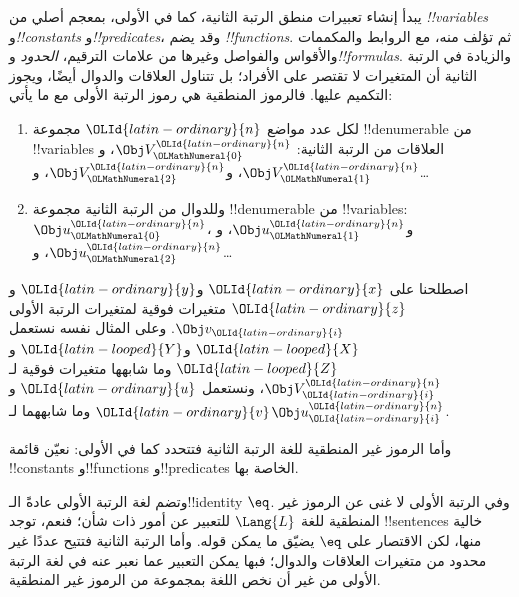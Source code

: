 \documentclass[../../../include/open-logic-section]{subfiles}
\begin{document}


يبدأ إنشاء تعبيرات منطق الرتبة الثانية، كما في الأولى، بمعجم
أصلي من \emph{!!{variable}s} و\emph{!!{constant}s}
و\emph{!!{predicate}s}، وقد يضم \emph{!!{function}s}.
ثم تؤلف منه، مع الروابط والمكممات والأقواس والفواصل وغيرها من
علامات الترقيم، \emph{الحدود} و\emph{!!{formula}s}.
والزيادة في الرتبة الثانية أن المتغيرات لا تقتصر على الأفراد؛
بل تتناول العلاقات والدوال أيضًا، ويجوز التكميم عليها.
فالرموز المنطقية هي رموز الرتبة الأولى مع ما يأتي:

\begin{enumerate}
\item لكل عدد مواضع ${\OLId{latin-ordinary}{n}}$ مجموعة !!{denumerable} من
  !!{variable}s العلاقات من الرتبة الثانية:
  $\Obj V_{\OLMathNumeral{0}}^{\OLId{latin-ordinary}{n}}$، و$\Obj V_{\OLMathNumeral{1}}^{\OLId{latin-ordinary}{n}}$، و$\Obj V_{\OLMathNumeral{2}}^{\OLId{latin-ordinary}{n}}$، و\dots
\item وللدوال من الرتبة الثانية مجموعة !!{denumerable} من
  !!{variable}s: $\Obj u_{\OLMathNumeral{0}}^{\OLId{latin-ordinary}{n}}$، و$\Obj u_{\OLMathNumeral{1}}^{\OLId{latin-ordinary}{n}}$، و$\Obj u_{\OLMathNumeral{2}}^{\OLId{latin-ordinary}{n}}$، و\dots
\end{enumerate}

اصطلحنا على ${\OLId{latin-ordinary}{x}}$ و${\OLId{latin-ordinary}{y}}$ و${\OLId{latin-ordinary}{z}}$ متغيرات فوقية لمتغيرات الرتبة
الأولى $\Obj v_{\OLId{latin-ordinary}{i}}$. وعلى المثال نفسه نستعمل ${\OLId{latin-looped}{X}}$ و${\OLId{latin-looped}{Y}}$ و${\OLId{latin-looped}{Z}}$
وما شابهها متغيرات فوقية لـ$\Obj V_{\OLId{latin-ordinary}{i}}^{\OLId{latin-ordinary}{n}}$، ونستعمل ${\OLId{latin-ordinary}{u}}$ و${\OLId{latin-ordinary}{v}}$
وما شابههما لـ$\Obj u_{\OLId{latin-ordinary}{i}}^{\OLId{latin-ordinary}{n}}$.

\begin{explain}
وأما الرموز غير المنطقية للغة الرتبة الثانية فتتحدد كما في
الأولى: نعيّن قائمة !!{constant}s و!!{function}s
و!!{predicate}s الخاصة بها.

وتضم لغة الرتبة الأولى عادةً الـ!!{identity} $\eq$.
وفي الرتبة الأولى لا غنى عن الرموز غير المنطقية للغة $\Lang{L}$
للتعبير عن أمور ذات شأن؛ فنعم، توجد !!{sentence}s خالية
منها، لكن الاقتصار على $\eq$ يضيّق ما يمكن قوله.
وأما الرتبة الثانية فتتيح عددًا غير محدود من متغيرات العلاقات
والدوال؛ فبها يمكن التعبير عما نعبر عنه في لغة الرتبة الأولى
من غير أن نخص اللغة بمجموعة من الرموز غير المنطقية.
\end{explain}
\end{document}
